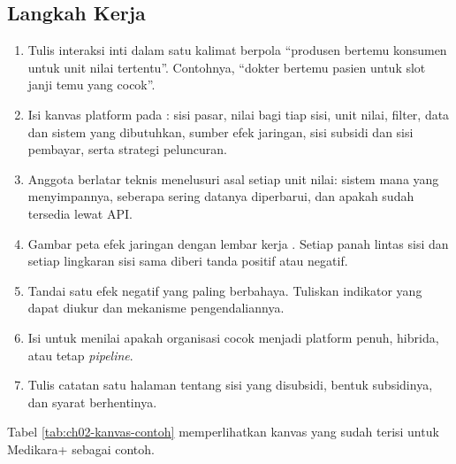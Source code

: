 \subsection*{Langkah Kerja}

\begin{enumerate}
  \item Tulis interaksi inti dalam satu kalimat berpola ``produsen bertemu
        konsumen untuk unit nilai tertentu''. Contohnya, ``dokter bertemu
        pasien untuk slot janji temu yang cocok''.
  \item Isi kanvas platform pada :
        sisi pasar, nilai bagi tiap sisi, unit nilai, filter, data dan sistem
        yang dibutuhkan, sumber efek jaringan, sisi subsidi dan sisi pembayar,
        serta strategi peluncuran.
  \item Anggota berlatar teknis menelusuri asal setiap unit nilai: sistem mana
        yang menyimpannya, seberapa sering datanya diperbarui, dan apakah sudah
        tersedia lewat API.
  \item Gambar peta efek jaringan dengan lembar kerja
        . Setiap panah lintas
        sisi dan setiap lingkaran sisi sama diberi tanda positif atau negatif.
  \item Tandai satu efek negatif yang paling berbahaya. Tuliskan indikator
        yang dapat diukur dan mekanisme pengendaliannya.
  \item Isi 
        untuk menilai apakah organisasi cocok menjadi platform penuh,
        hibrida, atau tetap \textit{pipeline}.
  \item Tulis catatan satu halaman tentang sisi yang disubsidi, bentuk
        subsidinya, dan syarat berhentinya.
\end{enumerate}

Tabel \ref{tab:ch02-kanvas-contoh} memperlihatkan kanvas yang sudah terisi
untuk Medikara+ sebagai contoh.

